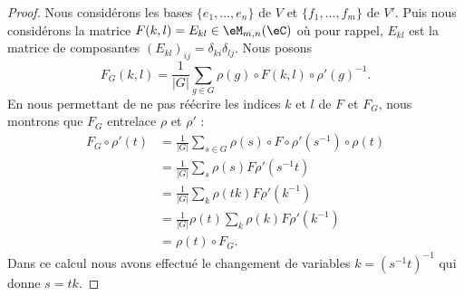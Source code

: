 \begin{proof}
	Nous considérons les bases \( \{ e_1,\ldots, e_n \} \) de \( V\) et \( \{ f_1,\ldots, f_m \}\) de \( V'\). Puis nous considérons la matrice \( F(k,l)=E_{kl}\in\eM_{m,n}(\eC)\) où pour rappel, \( E_{kl}\) est la matrice de composantes \( (E_{kl})_{ij}=\delta_{ki}\delta_{lj}\). Nous posons
	\begin{equation}
		F_G(k,l)=\frac{1}{ | G | }\sum_{g\in G}\rho(g)\circ F(k,l)\circ\rho'(g)^{-1}.
	\end{equation}
	En nous permettant de ne pas réécrire les indices \( k\) et \(l \) de \( F\) et \( F_G\), nous montrons que \( F_G\) entrelace \( \rho\) et \( \rho'\) :
	\begin{subequations}
		\begin{align}
			F_G\circ\rho'(t) & =\frac{1}{ | G | }\sum_{s\in G}\rho(s)\circ F\circ \rho'(s^{-1})\circ \rho(t) \\
			                 & =\frac{1}{ | G | }\sum_s\rho(s)F\rho'(s^{-1} t)                               \\
			                 & =\frac{1}{ | G | }\sum_{k}\rho(tk)F\rho'(k^{-1})                              \\
			                 & =\frac{1}{ | G | }\rho(t) \sum_k\rho(k)F\rho'(k^{-1})                         \\
			                 & =\rho(t)\circ F_G.
		\end{align}
	\end{subequations}
	Dans ce calcul nous avons effectué le changement de variables \( k=(s^{-1} t)^{-1}\) qui donne \( s=tk\).


\end{proof}
